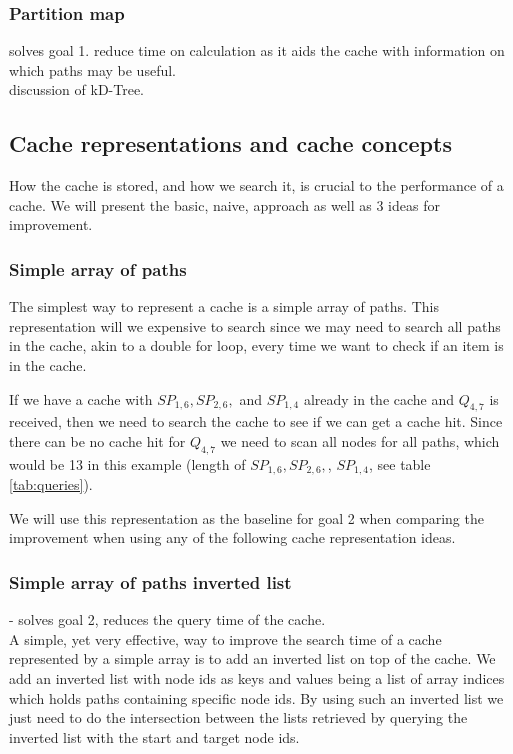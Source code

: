%


\subsubsection{Partition map} 
solves goal 1. reduce time on \spath calculation as it aids the cache with information on which paths may be useful.\\ 
discussion of kD-Tree.


\subsection{Cache representations and cache concepts} \label{subsec:cacherepresentatons}
How the cache is stored, and how we search it, is crucial to the performance of a cache. We will present the basic, naive, approach as well as 3 ideas for improvement.
% 
\subsubsection{Simple array of paths}%
The simplest way to represent a cache is a simple array of paths. This representation will we expensive to search since we may need to search all paths in the cache, akin to a double for loop, every time we want to check if an item is in the cache.

If we have a cache with $SP_{1,6},SP_{2,6},$ and $SP_{1,4}$ already in the cache and $Q_{4,7}$ is received, then we need to search the cache to see if we can get a cache hit. Since there can be no cache hit for $Q_{4,7}$ we need to scan all nodes for all paths, which would be 13 in this example (length of $SP_{1,6},SP_{2,6},$, $SP_{1,4}$, see table \ref{tab:queries}).

We will use this representation as the baseline for goal 2 when comparing the improvement when using any of the following cache representation ideas.

\subsubsection{Simple array of paths inverted list} - solves goal 2, reduces the query time of the cache.\\
A simple, yet very effective, way to improve the search time of a cache represented by a simple array is to add an inverted list on top of the cache. We add an inverted list with node ids as keys and values being a list of array indices which holds paths containing specific node ids. By using such an inverted list we just need to do the intersection between the lists retrieved by querying the inverted list with the start and target node ids. 


